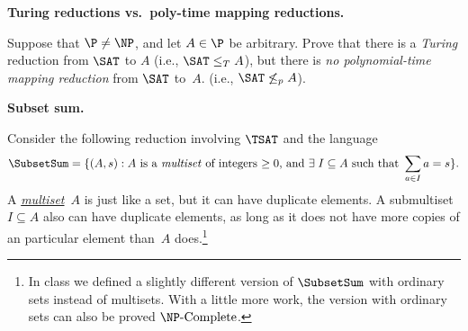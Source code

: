 \documentclass[11pt,addpoints]{exam}
\newcommand{\NPComplete}{\NP\text{-Complete}}
\newcommand{\NPHard}{\NP\text{-Hard}}
\begin{document}
\begin{questions}

  \question[10] \textbf{Turing reductions vs.\ poly-time mapping reductions.}
  
  Suppose that $\P \neq \NP$, and let $A \in \P$ be arbitrary.
  Prove that there is a \emph{Turing} reduction from $\SAT$ to $A$ (i.e., $\SAT \leq_T A$), but there is \emph{no polynomial-time mapping reduction} from $\SAT$ to~$A$.
  (i.e., $\SAT \not\leq_p A$).
  
  \begin{solution}
    
  \end{solution}

  \pagebreak

  \question \textbf{Subset sum.}\label{ques:subsetsum}

  Consider the following reduction involving $\TSAT$ and the language
  \[ \SubsetSum = \set{(A, s) : A \text{ is a \emph{multiset} of integers $\geq 0$, and } \exists\; I \subseteq A \text{ such that } \sum_{a \in I} a = s}.
  \]
  A \href{https://en.wikipedia.org/wiki/Multiset}{\emph{multiset}}~$A$ is just like a set, but it can have duplicate elements.
  A submultiset $I \subseteq A$ also can have duplicate elements, as long as it does not have more copies of an particular element than~$A$ does.\footnote{In class we defined a slightly different version of $\SubsetSum$ with ordinary sets instead of multisets.
  With a little more work, the version with ordinary sets can also be proved $\NPComplete$.}


\end{questions}
\end{document}
